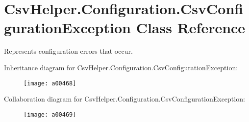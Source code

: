 \hypertarget{a00054}{\section{Csv\-Helper.\-Configuration.\-Csv\-Configuration\-Exception Class Reference}
\label{a00054}
}


Represents configuration errors that occur.  




Inheritance diagram for Csv\-Helper.\-Configuration.\-Csv\-Configuration\-Exception\-:
\nopagebreak
\begin{figure}[H]
\begin{center}
\leavevmode
\texttt{[image: a00468]}
\end{center}
\end{figure}


Collaboration diagram for Csv\-Helper.\-Configuration.\-Csv\-Configuration\-Exception\-:
\nopagebreak
\begin{figure}[H]
\begin{center}
\leavevmode
\texttt{[image: a00469]}
\end{center}
\end{figure}
